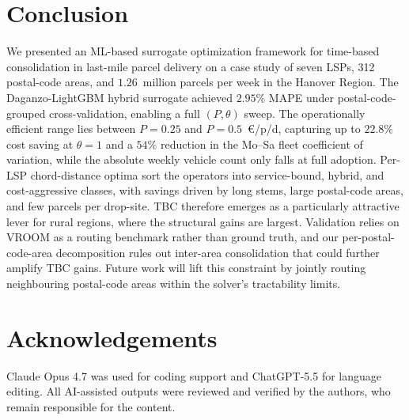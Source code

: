 \documentclass[preprint,12pt,authoryear]{elsarticle}
\begin{document}
\section{Conclusion}
\label{concl}

We presented an ML-based surrogate optimization framework for time-based consolidation in last-mile parcel delivery on a case study of seven LSPs, 312 postal-code areas, and $1.26$~million parcels per week in the Hanover Region. The Daganzo-LightGBM hybrid surrogate achieved $2.95\%$ MAPE under postal-code-grouped cross-validation, enabling a full $(P, \theta)$ sweep. The operationally efficient range lies between $P = 0.25$ and $P = 0.5$~\euro/p/d, capturing up to $22.8\%$ cost saving at $\theta = 1$ and a $54\%$ reduction in the Mo--Sa fleet coefficient of variation, while the absolute weekly vehicle count only falls at full adoption. Per-LSP chord-distance optima sort the operators into service-bound, hybrid, and cost-aggressive classes, with savings driven by long stems, large postal-code areas, and few parcels per drop-site. TBC therefore emerges as a particularly attractive lever for rural regions, where the structural gains are largest. Validation relies on VROOM as a routing benchmark rather than ground truth, and our per-postal-code-area decomposition rules out inter-area consolidation that could further amplify TBC gains. Future work will lift this constraint by jointly routing neighbouring postal-code areas within the solver's tractability limits.




\section*{Acknowledgements}

Claude Opus 4.7 was used for coding support and ChatGPT-5.5 for language editing. All AI-assisted outputs were reviewed and verified by the authors, who remain responsible for the content.





\end{document}
